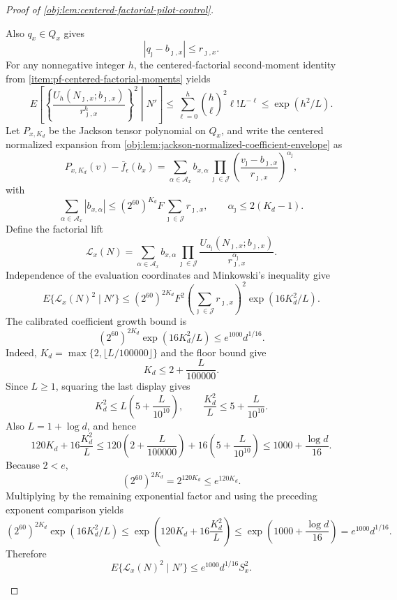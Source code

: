 \begin{proof}[Proof of \cref{obj:lem:centered-factorial-pilot-control}]
\begin{enumerate}
Also \(q_x\in Q_x\) gives
\[
|q_\jmath-b_{\jmath,x}|\le r_{\jmath,x}.
\]
For any nonnegative integer \(h\), the centered-factorial second-moment identity from \cref{item:pf-centered-factorial-moments} yields
\[
E\left[
\left\{
\frac{U_h(N_{\jmath,x};b_{\jmath,x})}{r_{\jmath,x}^h}
\right\}^2
\middle|N'
\right]
\le
\sum_{\ell=0}^{h}\binom h\ell^2\ell!L^{-\ell}
\le
\exp(h^2/L).
\]
Let \(P_{x,K_d}\) be the Jackson tensor polynomial on \(Q_x\), and write the centered normalized expansion from
\cref{obj:lem:jackson-normalized-coefficient-envelope} as
\[
P_{x,K_d}(v)-\bar f_\epsilon(b_x)
=
\sum_{\alpha\in\mathcal A_x}b_{x,\alpha}
\prod_{\jmath\in\mathcal J}
\left(\frac{v_\jmath-b_{\jmath,x}}{r_{\jmath,x}}\right)^{\alpha_\jmath},
\]
with
\[
\sum_{\alpha\in\mathcal A_x}|b_{x,\alpha}|
\le (2^{60})^{K_d}F\sum_{\jmath\in\mathcal J}r_{\jmath,x},
\qquad
\alpha_\jmath\le2(K_d-1).
\]
Define the factorial lift
\[
\mathcal L_x(N)
=
\sum_{\alpha\in\mathcal A_x}b_{x,\alpha}
\prod_{\jmath\in\mathcal J}
\frac{U_{\alpha_\jmath}(N_{\jmath,x};b_{\jmath,x})}
{r_{\jmath,x}^{\alpha_\jmath}} .
\]
Independence of the evaluation coordinates and Minkowski's inequality give
\[
E\{\mathcal L_x(N)^2\mid N'\}
\le
(2^{60})^{2K_d}F^2
\left(\sum_{\jmath\in\mathcal J}r_{\jmath,x}\right)^2
\exp(16K_d^2/L).
\]
The calibrated coefficient growth bound is
\[
(2^{60})^{2K_d}\exp(16K_d^2/L)
\le e^{1000}d^{1/16}.
\]
Indeed, \(K_d=\max\{2,\lfloor L/100000\rfloor\}\) and the floor bound give
\[
K_d\le 2+\frac{L}{100000}.
\]
Since \(L\ge1\), squaring the last display gives
\[
K_d^2\le L\left(5+\frac{L}{10^{10}}\right),
\qquad
\frac{K_d^2}{L}\le 5+\frac{L}{10^{10}}.
\]
Also \(L=1+\log d\), and hence
\[
120K_d+16\frac{K_d^2}{L}
\le
120\left(2+\frac{L}{100000}\right)
+16\left(5+\frac{L}{10^{10}}\right)
\le
1000+\frac{\log d}{16}.
\]
Because \(2<e\),
\[
(2^{60})^{2K_d}=2^{120K_d}\le e^{120K_d}.
\]
Multiplying by the remaining exponential factor and using the preceding exponent comparison yields
\[
(2^{60})^{2K_d}\exp(16K_d^2/L)
\le
\exp\left(120K_d+16\frac{K_d^2}{L}\right)
\le
\exp\left(1000+\frac{\log d}{16}\right)
=e^{1000}d^{1/16}.
\]
Therefore
\[
E\{\mathcal L_x(N)^2\mid N'\}
\le
e^{1000}d^{1/16}S_x^2 .
\]


\end{enumerate}
\end{proof}
